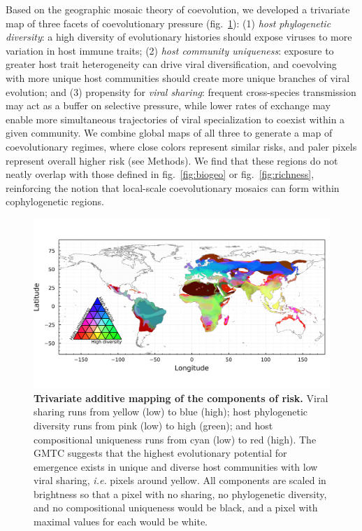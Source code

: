 \documentclass[11pt]{article}
\makeatletter
\def\maxwidth{\ifdim\Gin@nat@width>\linewidth\linewidth
\else\Gin@nat@width\fi}
\let\Oldincludegraphics\includegraphics
\renewcommand{\includegraphics}[1]{\Oldincludegraphics[width=\maxwidth]{#1}}
\makeatother
\begin{document}
Based on the geographic mosaic theory of coevolution, we developed a
trivariate map of three facets of coevolutionary pressure
(fig.~\ref{fig:trivariate}): (1) \emph{host phylogenetic diversity}: a
high diversity of evolutionary histories should expose viruses to more
variation in host immune traits; (2) \emph{host community uniqueness}:
exposure to greater host trait heterogeneity can drive viral
diversification, and coevolving with more unique host communities should
create more unique branches of viral evolution; and (3) propensity for
\emph{viral sharing}: frequent cross-species transmission may act as a
buffer on selective pressure, while lower rates of exchange may enable
more simultaneous trajectories of viral specialization to coexist within
a given community. We combine global maps of all three to generate a map
of coevolutionary regimes, where close colors represent similar risks,
and paler pixels represent overall higher risk (see Methods). We find
that these regions do not neatly overlap with those defined in
fig.~\ref{fig:biogeo} or fig.~\ref{fig:richness}, reinforcing the notion
that local-scale coevolutionary mosaics can form within cophylogenetic
regions.

\begin{figure}
\hypertarget{fig:trivariate}{%
\centering
\includegraphics{figures/risk_trivariate.png}
\caption{\textbf{Trivariate additive mapping of the components of risk.}
Viral sharing runs from yellow (low) to blue (high); host phylogenetic
diversity runs from pink (low) to high (green); and host compositional
uniqueness runs from cyan (low) to red (high). The GMTC suggests that
the highest evolutionary potential for emergence exists in unique and
diverse host communities with low viral sharing, \emph{i.e.} pixels
around yellow. All components are scaled in brightness so that a pixel
with no sharing, no phylogenetic diversity, and no compositional
uniqueness would be black, and a pixel with maximal values for each
would be white.}\label{fig:trivariate}
}
\end{figure}
\end{document}
